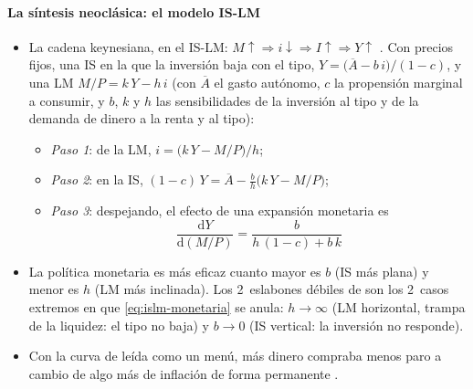 \documentclass[11pt]{article}
\begin{document}
\paragraph{La síntesis neoclásica: el modelo IS-LM}
\begin{itemize}
\item La cadena keynesiana, en el IS-LM: $M\uparrow\Rightarrow i\downarrow\Rightarrow I\uparrow\Rightarrow Y\uparrow$\nocite{Hicks1937Keynes} . Con precios fijos, una IS en la que la inversión baja con el tipo, $Y=\big(\overline{A}-b\,i\big)/(1-c)$, y una LM $M/P=k\,Y-h\,i$ (con $\overline{A}$ el gasto autónomo, $c$ la propensión marginal a consumir, y $b$, $k$ y $h$ las sensibilidades de la inversión al tipo y de la demanda de dinero a la renta y al tipo):
  \begin{itemize}
  \item \emph{Paso 1}: de la LM, $i=\big(k\,Y-M/P\big)/h$;
  \item \emph{Paso 2}: en la IS, $(1-c)\,Y=\overline{A}-\frac{b}{h}\big(k\,Y-M/P\big)$;
  \item \emph{Paso 3}: despejando, el efecto de una expansión monetaria es
  \begin{equation}
  \frac{\mathrm{d}Y}{\mathrm{d}(M/P)}=\frac{b}{h\,(1-c)+b\,k} \label{eq:islm-monetaria}
  \end{equation}
  \end{itemize}
\item La política monetaria es más eficaz cuanto mayor es $b$ (IS más plana) y menor es $h$ (LM más inclinada). Los 2~eslabones débiles de  son los 2~casos extremos en que \eqref{eq:islm-monetaria} se anula: $h\to\infty$ (LM horizontal, trampa de la liquidez: el tipo no baja) y $b\to0$ (IS vertical: la inversión no responde).
\item Con la curva de  leída como un menú, más dinero compraba menos paro a cambio de algo más de inflación de forma permanente\nocite{SamuelsonSolow1960Analytical} .
\end{itemize}
\end{document}
